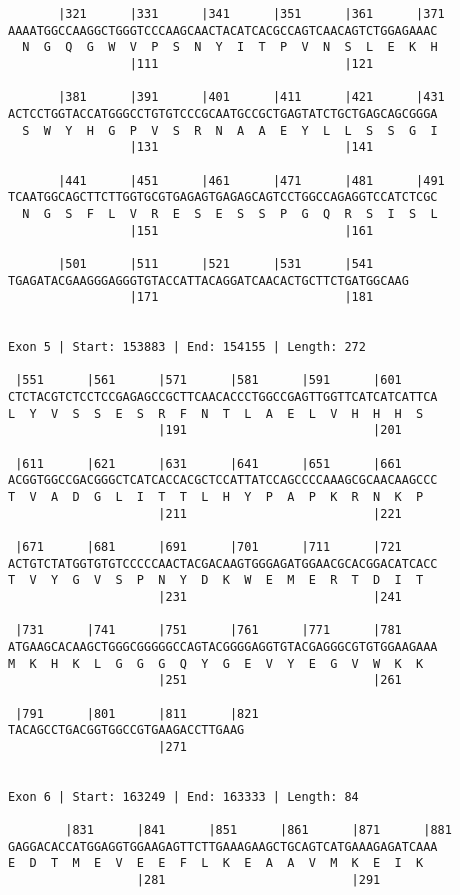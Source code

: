 \documentclass{article}
\begin{document}
\begin{Verbatim}
       |321      |331      |341      |351      |361      |371
AAAATGGCCAAGGCTGGGTCCCAAGCAACTACATCACGCCAGTCAACAGTCTGGAGAAAC
  N  G  Q  G  W  V  P  S  N  Y  I  T  P  V  N  S  L  E  K  H
                 |111                          |121         
  
       |381      |391      |401      |411      |421      |431
ACTCCTGGTACCATGGGCCTGTGTCCCGCAATGCCGCTGAGTATCTGCTGAGCAGCGGGA
  S  W  Y  H  G  P  V  S  R  N  A  A  E  Y  L  L  S  S  G  I
                 |131                          |141         
  
       |441      |451      |461      |471      |481      |491
TCAATGGCAGCTTCTTGGTGCGTGAGAGTGAGAGCAGTCCTGGCCAGAGGTCCATCTCGC
  N  G  S  F  L  V  R  E  S  E  S  S  P  G  Q  R  S  I  S  L
                 |151                          |161         
  
       |501      |511      |521      |531      |541     
TGAGATACGAAGGGAGGGTGTACCATTACAGGATCAACACTGCTTCTGATGGCAAG
                 |171                          |181     
  
 
Exon 5 | Start: 153883 | End: 154155 | Length: 272
 
 |551      |561      |571      |581      |591      |601     
CTCTACGTCTCCTCCGAGAGCCGCTTCAACACCCTGGCCGAGTTGGTTCATCATCATTCA
L  Y  V  S  S  E  S  R  F  N  T  L  A  E  L  V  H  H  H  S  
                     |191                          |201     
  
 |611      |621      |631      |641      |651      |661     
ACGGTGGCCGACGGGCTCATCACCACGCTCCATTATCCAGCCCCAAAGCGCAACAAGCCC
T  V  A  D  G  L  I  T  T  L  H  Y  P  A  P  K  R  N  K  P  
                     |211                          |221     
  
 |671      |681      |691      |701      |711      |721     
ACTGTCTATGGTGTGTCCCCCAACTACGACAAGTGGGAGATGGAACGCACGGACATCACC
T  V  Y  G  V  S  P  N  Y  D  K  W  E  M  E  R  T  D  I  T  
                     |231                          |241     
  
 |731      |741      |751      |761      |771      |781     
ATGAAGCACAAGCTGGGCGGGGGCCAGTACGGGGAGGTGTACGAGGGCGTGTGGAAGAAA
M  K  H  K  L  G  G  G  Q  Y  G  E  V  Y  E  G  V  W  K  K  
                     |251                          |261     
  
 |791      |801      |811      |821
TACAGCCTGACGGTGGCCGTGAAGACCTTGAAG
                     |271        
  
 
Exon 6 | Start: 163249 | End: 163333 | Length: 84
 
        |831      |841      |851      |861      |871      |881
GAGGACACCATGGAGGTGGAAGAGTTCTTGAAAGAAGCTGCAGTCATGAAAGAGATCAAA
E  D  T  M  E  V  E  E  F  L  K  E  A  A  V  M  K  E  I  K  
                  |281                          |291        
  

\end{Verbatim}
\end{document}
